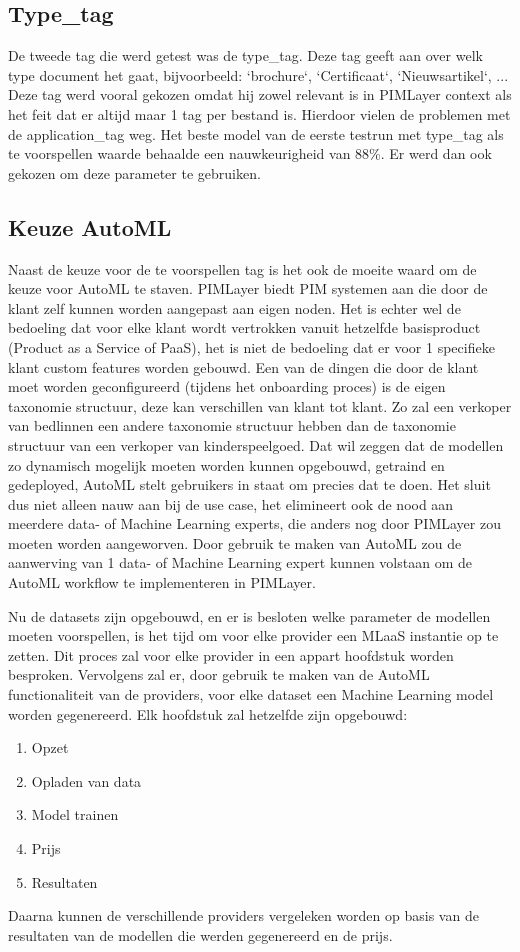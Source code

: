 \subsection{Type\_tag}
De tweede tag die werd getest was de type\_tag. Deze tag geeft aan over welk type document het gaat, bijvoorbeeld: `brochure`, `Certificaat`, `Nieuwsartikel`, ... Deze tag werd vooral gekozen omdat hij zowel relevant is in PIMLayer context als het feit dat er altijd maar 1 tag per bestand is. Hierdoor vielen de problemen met de application\_tag weg. Het beste model van de eerste testrun met type\_tag als te voorspellen waarde behaalde een nauwkeurigheid van 88\%. Er werd dan ook gekozen om deze parameter te gebruiken. 

\subsection{Keuze AutoML}
Naast de keuze voor de te voorspellen tag is het ook de moeite waard om de keuze voor AutoML te staven. 
PIMLayer biedt PIM systemen aan die door de klant zelf kunnen worden aangepast aan eigen noden. Het is echter wel de bedoeling dat voor elke klant wordt vertrokken vanuit hetzelfde basisproduct (Product as a Service of PaaS), het is niet de bedoeling dat er voor 1 specifieke klant custom features worden gebouwd. Een van de dingen die door de klant moet worden geconfigureerd (tijdens het onboarding proces) is de eigen taxonomie structuur, deze kan verschillen van klant tot klant. Zo zal een verkoper van bedlinnen een andere taxonomie structuur hebben dan de taxonomie structuur van een verkoper van kinderspeelgoed. Dat wil zeggen dat de modellen zo dynamisch mogelijk moeten worden kunnen opgebouwd, getraind en gedeployed, AutoML stelt gebruikers in staat om precies dat te doen. Het sluit dus niet alleen nauw aan bij de use case, het elimineert ook de nood aan meerdere data- of Machine Learning experts, die anders nog door PIMLayer zou moeten worden aangeworven. Door gebruik te maken van AutoML zou de aanwerving van 1 data- of Machine Learning expert kunnen volstaan om de AutoML workflow te implementeren in PIMLayer. 

Nu de datasets zijn opgebouwd, en er is besloten welke parameter de modellen moeten voorspellen,  is het tijd om voor elke provider een MLaaS instantie op te zetten. Dit proces zal voor elke provider in een appart hoofdstuk worden besproken. 
Vervolgens zal er, door gebruik te maken van de AutoML functionaliteit van de providers, voor elke dataset een Machine Learning model worden gegenereerd. Elk hoofdstuk zal hetzelfde zijn opgebouwd: 
\begin{enumerate}
    \item Opzet
    \item Opladen van data
    \item Model trainen
    \item Prijs
    \item Resultaten
\end{enumerate}
Daarna kunnen de verschillende providers vergeleken worden op basis van de resultaten van de modellen die werden gegenereerd en de prijs. 

